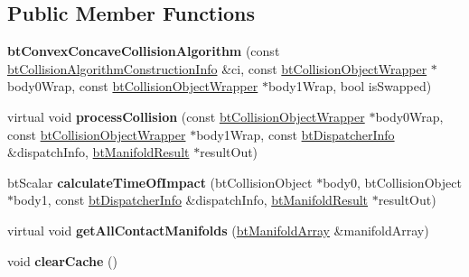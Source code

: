 \subsection*{Public Member Functions}
\begin{DoxyCompactItemize}
\item 
\mbox{\label{classbtConvexConcaveCollisionAlgorithm_a163b3a3ea828565ea58e6acfd7434505}} 
{\bfseries bt\+Convex\+Concave\+Collision\+Algorithm} (const \hyperlink{structbtCollisionAlgorithmConstructionInfo}{bt\+Collision\+Algorithm\+Construction\+Info} \&ci, const \hyperlink{structbtCollisionObjectWrapper}{bt\+Collision\+Object\+Wrapper} $\ast$body0\+Wrap, const \hyperlink{structbtCollisionObjectWrapper}{bt\+Collision\+Object\+Wrapper} $\ast$body1\+Wrap, bool is\+Swapped)
\item 
\mbox{\label{classbtConvexConcaveCollisionAlgorithm_af9942ac6cc9024779ec2687c092d2d17}} 
virtual void {\bfseries process\+Collision} (const \hyperlink{structbtCollisionObjectWrapper}{bt\+Collision\+Object\+Wrapper} $\ast$body0\+Wrap, const \hyperlink{structbtCollisionObjectWrapper}{bt\+Collision\+Object\+Wrapper} $\ast$body1\+Wrap, const \hyperlink{structbtDispatcherInfo}{bt\+Dispatcher\+Info} \&dispatch\+Info, \hyperlink{classbtManifoldResult}{bt\+Manifold\+Result} $\ast$result\+Out)
\item 
\mbox{\label{classbtConvexConcaveCollisionAlgorithm_a6d6690180cedd5e41c5ce632a2fb2350}} 
bt\+Scalar {\bfseries calculate\+Time\+Of\+Impact} (bt\+Collision\+Object $\ast$body0, bt\+Collision\+Object $\ast$body1, const \hyperlink{structbtDispatcherInfo}{bt\+Dispatcher\+Info} \&dispatch\+Info, \hyperlink{classbtManifoldResult}{bt\+Manifold\+Result} $\ast$result\+Out)
\item 
\mbox{\label{classbtConvexConcaveCollisionAlgorithm_adc2ee2058d09d696b42e64f1ab03ef93}} 
virtual void {\bfseries get\+All\+Contact\+Manifolds} (\hyperlink{classbtAlignedObjectArray}{bt\+Manifold\+Array} \&manifold\+Array)
\item 
\mbox{\label{classbtConvexConcaveCollisionAlgorithm_a73fa1c9ce188094312b3372e1948dcf5}} 
void {\bfseries clear\+Cache} ()

\end{DoxyCompactItemize}
